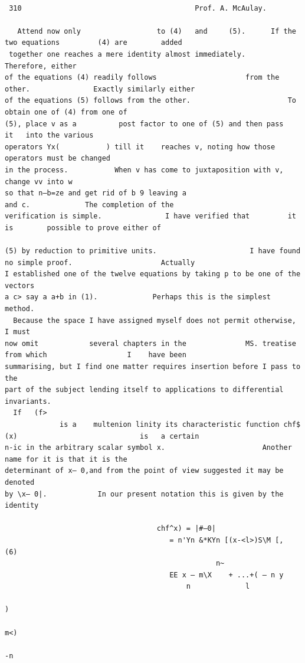 \documentclass[10pt]{article}
\begin{document}
\clearpage
\begin{verbatim}

 310                                         Prof. A. McAulay.

   Attend now only                  to (4)   and     (5).      If the       two equations         (4) are        added
 together one reaches a mere identity almost immediately.                                       Therefore, either
of the equations (4) readily follows                     from the other.               Exactly similarly either
of the equations (5) follows from the other.                       To obtain one of (4) from one of
(5), place v as a          post factor to one of (5) and then pass                         it   into the various
operators Yx(           ) till it    reaches v, noting how those operators must be changed
in the process.           When v has come to juxtaposition with v, change vv into w
so that n—b=ze and get rid of b 9 leaving a                         and c.             The completion of the
verification is simple.               I have verified that         it is        possible to prove either of

(5) by reduction to primitive units.                      I have found no simple proof.                     Actually
I established one of the twelve equations by taking p to be one of the vectors
a c> say a a+b in (1).             Perhaps this is the simplest method.
  Because the space I have assigned myself does not permit otherwise, I must
now omit            several chapters in the              MS. treatise from which                   I    have been
summarising, but I find one matter requires insertion before I pass to the
part of the subject lending itself to applications to differential invariants.
  If   (f>
             is a    multenion linity its characteristic function chf$ (x)                             is   a certain
n-ic in the arbitrary scalar symbol x.                       Another name for it is that it is the
determinant of x— 0,and from the point of view suggested it may be denoted
by \x— 0|.            In our present notation this is given by the identity

                                    chf^x) = |#—0|
                                       = n'Yn &*KYn [(x-<l>)S\M [,                                                (6)
                                                  n~
                                       EE x — m\X    + ...+( — n y
                                           n             l
                                                                            )
                                                                                m<)
                                                                                  -n




\end{verbatim}
\end{document}
